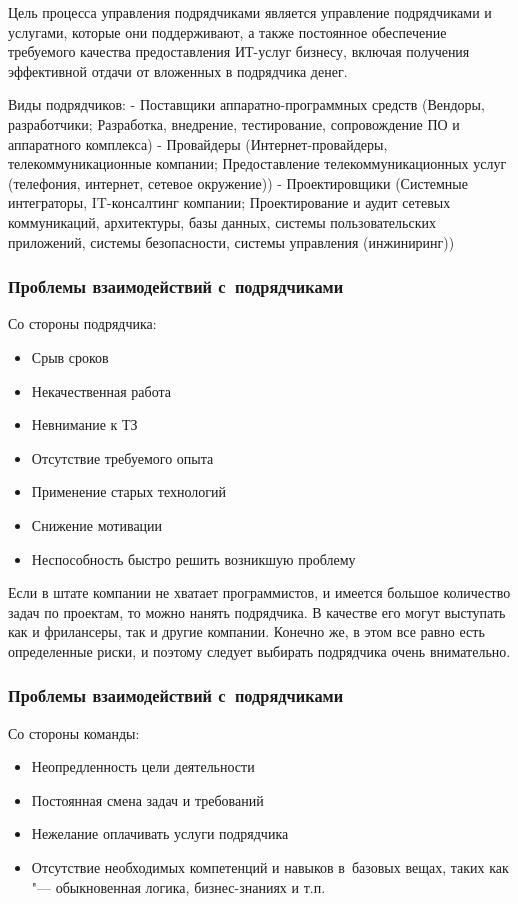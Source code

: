 \documentclass{../industrial-development}
\begin{document}
Цель процесса управления подрядчиками является управление подрядчиками и услугами, которые они поддерживают, а также постоянное обеспечение требуемого качества предоставления ИТ-услуг бизнесу, включая получения эффективной отдачи от вложенных в подрядчика денег.

Виды подрядчиков:
- Поставщики аппаратно-программных средств (Вендоры, разработчики; Разработка, внедрение, тестирование, сопровождение ПО и аппаратного комплекса)
- Провайдеры (Интернет-провайдеры, телекоммуникационные компании; Предоставление телекоммуникационных услуг (телефония, интернет, сетевое окружение))
- Проектировщики (Системные интеграторы, IT-консалтинг компании; Проектирование и аудит сетевых коммуникаций, архитектуры, базы данных, системы пользовательских приложений, системы безопасности, системы управления (инжиниринг))

\begin{frame} \frametitle{Проблемы взаимодействий с~подрядчиками}
	Со стороны подрядчика:
	\begin{itemize}
		\item Срыв сроков 
		\item Некачественная работа
		\item Невнимание к ТЗ
		\item Отсутствие требуемого опыта
		\item Применение старых технологий
		\item Снижение мотивации
		\item Неспособность быстро решить возникшую проблему
  	\end{itemize}
\end{frame}

\lecturenotes
Если в штате компании не хватает программистов, и имеется большое количество задач по проектам, то можно нанять подрядчика. В качестве его могут выступать как и фрилансеры, так и другие компании. Конечно же, в этом все равно есть определенные риски, и поэтому следует выбирать подрядчика очень внимательно. 

\begin{frame} \frametitle{Проблемы взаимодействий с~подрядчиками}
	Со стороны команды:
	\begin{itemize}
		\item Неопредленность цели деятельности
		\item Постоянная смена задач и требований
		\item Нежелание оплачивать услуги подрядчика
		\item Отсутствие необходимых компетенций и навыков  в~базовых вещах, таких как "--- обыкновенная логика, бизнес-знаниях и т.п.
	\end{itemize}
\end{frame}
\end{document}
